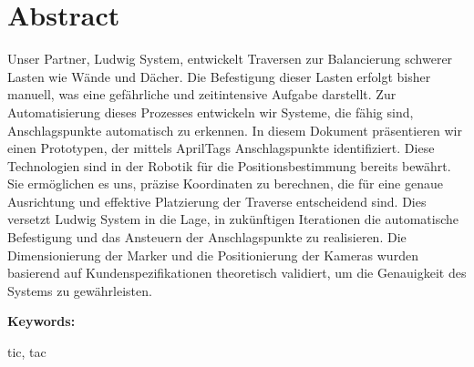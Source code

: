 \section*{Abstract}
Unser Partner, Ludwig System, entwickelt Traversen zur Balancierung schwerer Lasten wie Wände und Dächer. Die Befestigung dieser Lasten erfolgt bisher manuell, was eine gefährliche und zeitintensive Aufgabe darstellt. Zur Automatisierung dieses Prozesses entwickeln wir Systeme, die fähig sind, Anschlagspunkte automatisch zu erkennen. In diesem Dokument präsentieren wir einen Prototypen, der mittels AprilTags Anschlagspunkte identifiziert. Diese Technologien sind in der Robotik für die Positionsbestimmung bereits bewährt. Sie ermöglichen es uns, präzise Koordinaten zu berechnen, die für eine genaue Ausrichtung und effektive Platzierung der Traverse entscheidend sind. Dies versetzt Ludwig System in die Lage, in zukünftigen Iterationen die automatische Befestigung und das Ansteuern der Anschlagspunkte zu realisieren. Die Dimensionierung der Marker und die Positionierung der Kameras wurden basierend auf Kundenspezifikationen theoretisch validiert, um die Genauigkeit des Systems zu gewährleisten.


\vspace{2ex}

\textbf{Keywords:}

tic, tac

\clearpage


